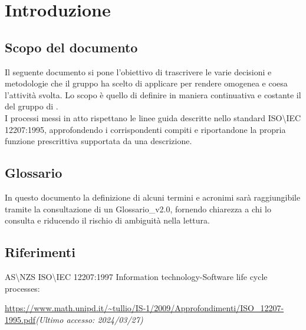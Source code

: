 \chapter{Introduzione}

\section{Scopo del documento}
Il seguente documento si pone l'obiettivo di trascrivere le varie decisioni e metodologie che il gruppo ha scelto di applicare per rendere omogenea e coesa l'attività svolta. Lo scopo è quello di definire in maniera continuativa e costante il  del gruppo di .\\
I processi messi in atto rispettano le linee guida descritte nello standard ISO\textbackslash IEC 12207:1995, approfondendo i corrispondenti compiti e riportandone la propria funzione prescrittiva supportata da una descrizione.

\section{Glossario}
In questo documento la definizione di alcuni termini e acronimi sarà raggiungibile tramite la consultazione di un Glossario\_v2.0, fornendo chiarezza a chi lo consulta e riducendo il rischio di ambiguità nella lettura.

\section{Riferimenti}
AS\textbackslash NZS ISO\textbackslash IEC 12207:1997 Information technology-Software life cycle processes:\\
\begin{footnotesize}
    \url{https://www.math.unipd.it/~tullio/IS-1/2009/Approfondimenti/ISO_12207-1995.pdf}\textit{(Ultimo accesso: 2024/03/27)}
\end{footnotesize}
